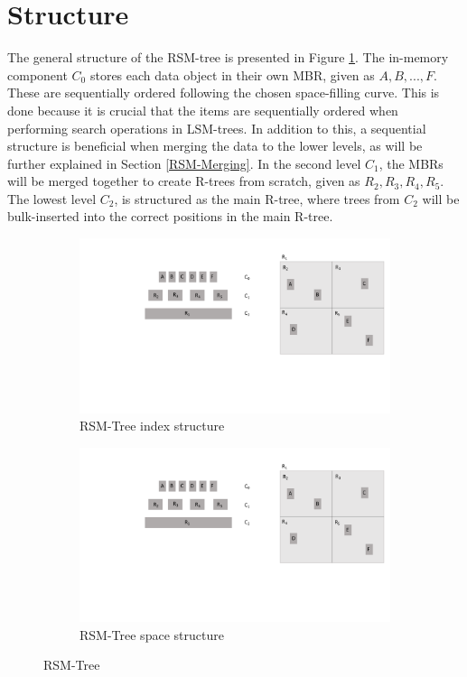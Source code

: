 \section{Structure}
The general structure of the RSM-tree is presented in Figure \ref{fig:RSMTree}. The in-memory component $C_0$ stores each data object in their own MBR, given as $A, B, ..., F$. These are sequentially ordered following the chosen space-filling curve. This is done because it is crucial that the items are sequentially ordered when performing search operations in LSM-trees. In addition to this, a sequential structure is beneficial when merging the data to the lower levels, as will be further explained in Section \ref{RSM-Merging}. In the second level $C_1$, the MBRs will be merged together to create R-trees from scratch, given as $R_2, R_3, R_4, R_5$. The lowest level $C_2$, is structured as the main R-tree, where trees from $C_2$ will be bulk-inserted into the correct positions in the main R-tree.  
\begin{figure}[ht]
     \centering
     \begin{subfigure}{0.45\textwidth}
         \centering
         \includegraphics[width=\textwidth]{figures/RSMTree.pdf}
         \caption{RSM-Tree index structure}
     \end{subfigure}
     \hfill
     \begin{subfigure}{0.45\textwidth}
         \centering
         \includegraphics[width=\textwidth]{figures/RSMTree_space.pdf}
         \caption{RSM-Tree space structure}
     \end{subfigure}
        \label{fig:RSMTree}
        \caption{RSM-Tree}
\end{figure}

